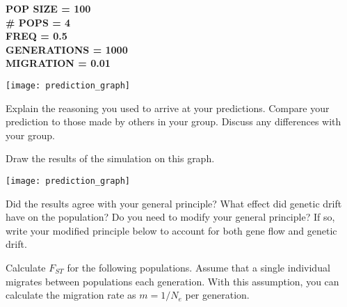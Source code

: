 \documentclass[11pt, addpoints]{exam}
\begin{document}
\begin{questions}
\ifprintanswers
	{\bfseries %
	POP SIZE = 100\\
	\# POPS = 4\\
	FREQ = 0.5\\
	GENERATIONS = 1000\\
	MIGRATION = 0.01 }\vspace*{16\baselineskip}
\else
	\begin{center}
		\texttt{[image: prediction\_graph]}
	\end{center}
\fi


\question[1]
Explain the reasoning you used to arrive at your
predictions. Compare your prediction to those made by others in your
group. Discuss any differences with your group.

\newpage

\question
Draw the results of the simulation on this graph.

\begin{center}
	\texttt{[image: prediction\_graph]}
\end{center}

\question[2]
Did the results agree with your general principle? What
effect did genetic drift have on the population? Do you need to modify
your general principle? If so, write your modified principle below to
account for both gene flow and genetic drift.

\newpage


\question[2]
Calculate $F_{ST}$ for the following
populations. Assume that a single individual migrates between
populations each generation. With this assumption, you can calculate the
migration rate as $m = 1/N_e$  per generation.


\end{questions}
\end{document}
